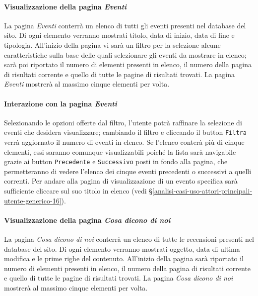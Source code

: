 \paragraph{Visualizzazione della pagina \textit{Eventi}}
\label{analisi-casi-uso-attori-principali-utente-generico-6}
La pagina \textit{Eventi} conterrà un elenco di tutti gli eventi presenti nel database del sito. Di ogni elemento verranno mostrati titolo, data di inizio, data di fine e tipologia. All'inizio della pagina vi sarà un filtro per la selezione alcune caratteristiche sulla base delle quali selezionare gli eventi da mostrare in elenco; sarà poi riportato il numero di elementi presenti in elenco, il numero della pagina di risultati corrente e quello di tutte le pagine di risultati trovati. La pagina \textit{Eventi} mostrerà al massimo cinque elementi per volta.


\paragraph{Interazione con la pagina \textit{Eventi}}
\label{analisi-casi-uso-attori-principali-utente-generico-7}
Selezionando le opzioni offerte dal filtro, l'utente potrà raffinare la selezione di eventi che desidera visualizzare; cambiando il filtro e cliccando il button \texttt{Filtra} verrà aggiornato il numero di eventi in elenco. Se l'elenco conterà più di cinque elementi, essi saranno comunque visualizzabili poiché la lista sarà navigabile grazie ai button \texttt{Precedente} e \texttt{Successivo} posti in fondo alla pagina, che permetteranno di vedere l'elenco dei cinque eventi precedenti o successivi a quelli correnti. Per andare alla pagina di visualizzazione di un evento specifica sarà sufficiente cliccare sul suo titolo in elenco (vedi §\ref{analisi-casi-uso-attori-principali-utente-generico-16}).


\paragraph{Visualizzazione della pagina \textit{Cosa dicono di noi}}
\label{analisi-casi-uso-attori-principali-utente-generico-8}
La pagina \textit{Cosa dicono di noi} conterrà un elenco di tutte le recensioni presenti nel database del sito. Di ogni elemento verranno mostrati oggetto, data di ultima modifica e le prime righe del contenuto. All'inizio della pagina sarà riportato il numero di elementi presenti in elenco, il numero della pagina di risultati corrente e quello di tutte le pagine di risultati trovati. La pagina \textit{Cosa dicono di noi} mostrerà al massimo cinque elementi per volta.


